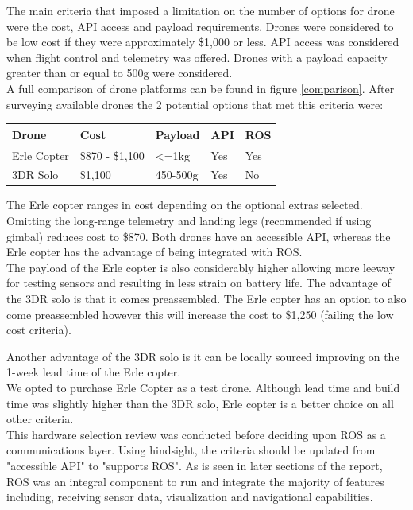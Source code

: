 \documentclass[capstone_report.tex]{subfiles}
\begin{document}
The main criteria that imposed a limitation on the number of options for drone were the cost, API access and payload requirements.  Drones were considered to be low cost if they were approximately \$1,000 or less.  API access was considered when flight control and telemetry was offered.  Drones with a payload capacity greater than or equal to 500g were considered.\\

A full comparison of drone platforms can be found in figure \ref{comparison}.  After surveying available drones the 2 potential options that met this criteria were:

\begin{table}[H]
\centering
\label{eligible_drones}
\begin{tabular}{@{}lllll@{}}
\toprule
Drone       & Cost          & Payload       & API & ROS \\ \midrule
Erle Copter & \$870 - \$1,100 & \textless=1kg & Yes & Yes \\
3DR Solo    & \$1,100       & 450-500g      & Yes & No  \\ \bottomrule
\end{tabular}
\end{table}

The Erle copter ranges in cost depending on the optional extras selected.  Omitting the long-range telemetry and landing legs (recommended if using gimbal) reduces cost to \$870.  Both drones have an accessible API, whereas the Erle copter has the advantage of being integrated with ROS.\\

The payload of the Erle copter is also considerably higher allowing more leeway for testing sensors and resulting in less strain on battery life.  The advantage of the 3DR solo is that it comes preassembled.  The Erle copter has an option to also come preassembled however this will increase the cost to \$1,250 (failing the low cost criteria).

Another advantage of the 3DR solo is it can be locally sourced improving on the 1-week lead time of the Erle copter.\\

We opted to purchase Erle Copter as a test drone.  Although lead time and build time was slightly higher than the 3DR solo, Erle copter is a better choice on all other criteria.\\

This hardware selection review was conducted before deciding upon ROS as a communications layer.  Using hindsight, the criteria should be updated from "accessible API" to "supports ROS".  As is seen in later sections of the report, ROS was an integral component to run and integrate the majority of features including, receiving sensor data, visualization and navigational capabilities.
\end{document}
